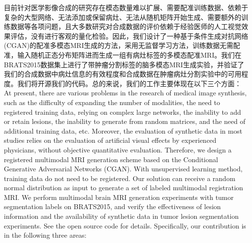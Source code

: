 \documentclass[letterpaper]{article} %
\begin{document}
目前针对医学影像合成的研究存在模态数量难以扩展、需要配准训练数据、依赖于复杂的大型网络、无法添加或保留病灶、无法从随机矩阵开始生成、需要额外的训练数据等各项问题，且大多数研究对合成数据的评价依赖于经验医师的人工视觉效果评估，没有进行客观的量化检验。因此，我们设计了一种基于条件生成对抗网络(CGAN)\cite{70mirza2014conditional}的配准多模态MRI生成的方法，采用无监督学习方法，训练数据无需配准，输入随机正态分布矩阵进而生成一组有病灶标签的多模态配准MRI。我们在BRATS2015数据集上进行了带肿瘤分割标签的脑多模态MRI生成实验，并验证了我们的合成数据中病灶信息的有效程度和合成数据在肿瘤病灶分割实验中的可用程度。我们将开源我们的代码。总的来说，我们的工作主要体现在以下三个方面：
At present, there are various problems in the research of medical image synthesis, such as the difficulty of expanding the number of modalities, the need to registered training data, relying on complex large networks, the inability to add or retain lesions, the inability to generate from random matrices, and the need of additional training data, etc. Moreover, the evaluation of synthetic data in most studies relies on the evaluation of artificial visual effects by experienced physicians, without objective quantitative evaluation. Therefore, we design a registered multimodal MRI generation scheme based on the Conditional Generative Adversarial Networks (CGAN)\cite{70mirza2014conditional}. With unsupervised learning method, training data do not need to be registered. Our solution can receive a random normal distribution as input to generate a set of labeled multimodal registration MRI. We perform multimodal brain MRI generation experiments with tumor segmentation labels on BRATS2015, and verify the effectiveness of lesion information and the availability of synthetic data in tumor lesion segmentation experiments. See the open source code for details. Specifically, our contribution is in the following three areas:
\end{document}
